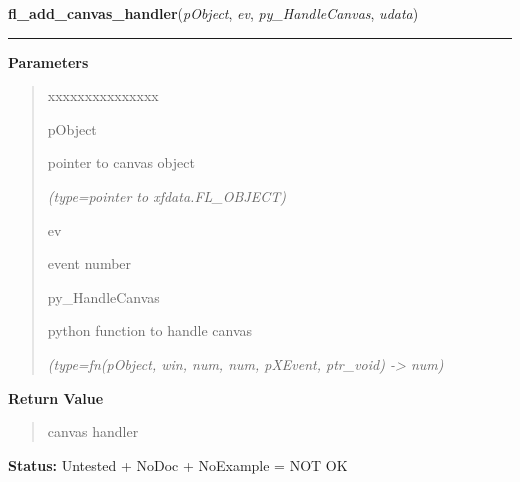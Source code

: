 \hspace{.8\funcindent}\begin{boxedminipage}{\funcwidth}

    \raggedright \textbf{fl\_add\_canvas\_handler}(\textit{pObject}, \textit{ev}, \textit{py\_HandleCanvas}, \textit{udata})

    \vspace{-1.5ex}

    \rule{\textwidth}{0.5\fboxrule}
\setlength{\parskip}{2ex}
\setlength{\parskip}{1ex}
      \textbf{Parameters}
      \vspace{-1ex}

      \begin{quote}
        \begin{Ventry}{xxxxxxxxxxxxxxx}

          \item[pObject]

          pointer to canvas object

            {\it (type=pointer to xfdata.FL\_OBJECT)}

          \item[ev]

          event number

          \item[py\_HandleCanvas]

          python function to handle canvas

            {\it (type=fn(pObject, win, num, num, pXEvent, ptr\_void) -{\textgreater} num)}

        \end{Ventry}

      \end{quote}

      \textbf{Return Value}
    \vspace{-1ex}

      \begin{quote}
      canvas handler

      \end{quote}

\textbf{Status:} Untested + NoDoc + NoExample = NOT OK



    \end{boxedminipage}

    \label{xformslib:library:fl_get_canvas_id}

